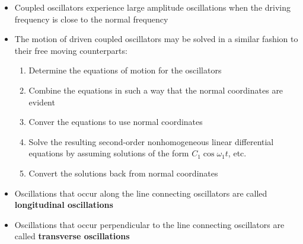 \documentclass{article}
\begin{document}
\begin{itemize}
  \item Coupled oscillators experience large amplitude oscillations when the driving frequency is close to the normal frequency

  \item The motion of driven coupled oscillators may be solved in a similar fashion to their free moving counterparts:

        \begin{enumerate}
          \item Determine the equations of motion for the oscillators

          \item Combine the equations in such a way that the normal coordinates are evident

          \item Conver the equations to use normal coordinates

          \item Solve the resulting second-order nonhomogeneous linear differential equations by assuming solutions of the form $C_1 \cos \omega_1 t$, etc.

          \item Convert the solutions back from normal coordinates
        \end{enumerate}

  \item Oscillations that occur along the line connecting oscillators are called \textbf{longitudinal oscillations}

  \item Oscillations that occur perpendicular to the line connecting oscillators are called \textbf{transverse oscillations}
\end{itemize}
\end{document}
